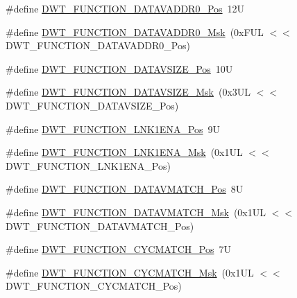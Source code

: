 \begin{DoxyCompactItemize}
\item 
\#define \mbox{\hyperlink{group___c_m_s_i_s___d_w_t_ga9854cd8bf16f7dce0fb196a8029b018e}{D\+W\+T\+\_\+\+F\+U\+N\+C\+T\+I\+O\+N\+\_\+\+D\+A\+T\+A\+V\+A\+D\+D\+R0\+\_\+\+Pos}}~12U
\item 
\#define \mbox{\hyperlink{group___c_m_s_i_s___d_w_t_gafc5efbe8f9b51e04aecd00c8a4eb50fb}{D\+W\+T\+\_\+\+F\+U\+N\+C\+T\+I\+O\+N\+\_\+\+D\+A\+T\+A\+V\+A\+D\+D\+R0\+\_\+\+Msk}}~(0x\+F\+U\+L $<$$<$ D\+W\+T\+\_\+\+F\+U\+N\+C\+T\+I\+O\+N\+\_\+\+D\+A\+T\+A\+V\+A\+D\+D\+R0\+\_\+\+Pos)
\item 
\#define \mbox{\hyperlink{group___c_m_s_i_s___d_w_t_ga0517a186d4d448aa6416440f40fe7a4d}{D\+W\+T\+\_\+\+F\+U\+N\+C\+T\+I\+O\+N\+\_\+\+D\+A\+T\+A\+V\+S\+I\+Z\+E\+\_\+\+Pos}}~10U
\item 
\#define \mbox{\hyperlink{group___c_m_s_i_s___d_w_t_gaab42cbc1e6084c44d5de70971613ea76}{D\+W\+T\+\_\+\+F\+U\+N\+C\+T\+I\+O\+N\+\_\+\+D\+A\+T\+A\+V\+S\+I\+Z\+E\+\_\+\+Msk}}~(0x3\+U\+L $<$$<$ D\+W\+T\+\_\+\+F\+U\+N\+C\+T\+I\+O\+N\+\_\+\+D\+A\+T\+A\+V\+S\+I\+Z\+E\+\_\+\+Pos)
\item 
\#define \mbox{\hyperlink{group___c_m_s_i_s___d_w_t_ga89d7c48858b4d4de96cdadfac91856a1}{D\+W\+T\+\_\+\+F\+U\+N\+C\+T\+I\+O\+N\+\_\+\+L\+N\+K1\+E\+N\+A\+\_\+\+Pos}}~9U
\item 
\#define \mbox{\hyperlink{group___c_m_s_i_s___d_w_t_ga64bd419260c3337cacf93607d1ad27ac}{D\+W\+T\+\_\+\+F\+U\+N\+C\+T\+I\+O\+N\+\_\+\+L\+N\+K1\+E\+N\+A\+\_\+\+Msk}}~(0x1\+U\+L $<$$<$ D\+W\+T\+\_\+\+F\+U\+N\+C\+T\+I\+O\+N\+\_\+\+L\+N\+K1\+E\+N\+A\+\_\+\+Pos)
\item 
\#define \mbox{\hyperlink{group___c_m_s_i_s___d_w_t_ga106f3672cd4be7c7c846e20497ebe5a6}{D\+W\+T\+\_\+\+F\+U\+N\+C\+T\+I\+O\+N\+\_\+\+D\+A\+T\+A\+V\+M\+A\+T\+C\+H\+\_\+\+Pos}}~8U
\item 
\#define \mbox{\hyperlink{group___c_m_s_i_s___d_w_t_ga32af1f1c0fcd2d8d9afd1ad79cd9970e}{D\+W\+T\+\_\+\+F\+U\+N\+C\+T\+I\+O\+N\+\_\+\+D\+A\+T\+A\+V\+M\+A\+T\+C\+H\+\_\+\+Msk}}~(0x1\+U\+L $<$$<$ D\+W\+T\+\_\+\+F\+U\+N\+C\+T\+I\+O\+N\+\_\+\+D\+A\+T\+A\+V\+M\+A\+T\+C\+H\+\_\+\+Pos)
\item 
\#define \mbox{\hyperlink{group___c_m_s_i_s___d_w_t_ga4b65d79ca37ae8010b4a726312413efd}{D\+W\+T\+\_\+\+F\+U\+N\+C\+T\+I\+O\+N\+\_\+\+C\+Y\+C\+M\+A\+T\+C\+H\+\_\+\+Pos}}~7U
\item 
\#define \mbox{\hyperlink{group___c_m_s_i_s___d_w_t_ga8e2ed09bdd33a8f7f7ce0444f5f3bb25}{D\+W\+T\+\_\+\+F\+U\+N\+C\+T\+I\+O\+N\+\_\+\+C\+Y\+C\+M\+A\+T\+C\+H\+\_\+\+Msk}}~(0x1\+U\+L $<$$<$ D\+W\+T\+\_\+\+F\+U\+N\+C\+T\+I\+O\+N\+\_\+\+C\+Y\+C\+M\+A\+T\+C\+H\+\_\+\+Pos)
$$
\end{DoxyCompactItemize}
